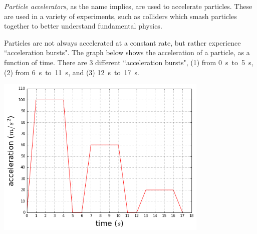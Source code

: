 \documentclass[12pt]{exam}
\begin{document}
\begin{questions}
	
	\question \textit{Particle accelerators}, as the name implies, are used to accelerate particles. These are used in a variety of experiments, such as colliders which smash particles together to better understand fundamental physics.
	
	Particles are not always accelerated at a constant rate, but rather experience ``acceleration bursts". The graph below shows the acceleration of a particle, as a function of time. There are 3 different ``acceleration bursts", (1) from 0~s~to~5~s, (2) from 6~s~to~11~s, and (3) 12~s~to~17~s.
	
	\begin{center}
	\includegraphics[width=4in]{../images/accelBursts.png}
	\end{center}
	
\end{questions}
\end{document}
